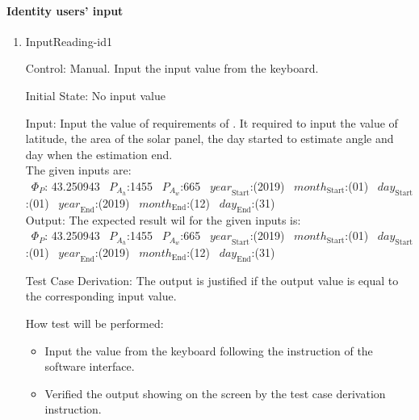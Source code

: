 \documentclass[12pt, titlepage]{article}
\begin{document}
\paragraph{Identity users' input}
\begin{enumerate}

\item{InputReading-id1\\}

Control: Manual. Input the input value from the keyboard.
					
Initial State: No input value
					
Input: Input the value of requirements of \progname. It required to input the
value of latitude, the area of the solar panel, the day started to estimate
angle and day when the estimation end.\\

 The given inputs are:\\
 ~$\Phi_P$: 43.250943 
~$P_{A_{h}}$:1455
~$P_{A_{w}}$:665
~$\mathit{year}_\text{Start}$:(2019) ~$\mathit{month}_\text{Start}$:(01) 
~$\mathit{day}_\text{Start}$:(01) ~$\mathit{year}_\text{End}$:(2019) 
~$\mathit{month}_\text{End}$:(12) 
~$\mathit{day}_\text{End}$:(31)\\

 Output: The expected result wil for the given inputs is:\\ 
~$\Phi_P$: 43.250943
~$P_{A_{h}}$:1455
~$P_{A_{w}}$:665
~$\mathit{year}_\text{Start}$:(2019) 
~$\mathit{month}_\text{Start}$:(01) 
~$\mathit{day}_\text{Start}$:(01) 
~$\mathit{year}_\text{End}$:(2019) 
~$\mathit{month}_\text{End}$:(12) 
~$\mathit{day}_\text{End}$:(31)\\


Test Case Derivation: The output is justified if the output value is equal to
the corresponding input value.

How test will be performed:
\begin{itemize}
\item Input the value from the keyboard following the instruction of the
software interface.
\item Verified the output showing on the screen by the test case derivation
instruction. 
\end{itemize}
\end{enumerate}

  
\end{document}
